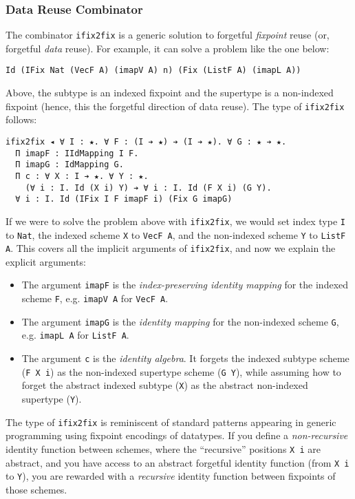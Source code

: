 \documentclass[acmsmall]{acmart}\settopmatter{}
\begin{document}
\subsubsection{Data Reuse Combinator}

The combinator \verb;ifix2fix; is a generic solution to forgetful
\textit{fixpoint} reuse (or, forgetful \textit{data} reuse). For
example, it can solve a problem like the one below:

\begin{verbatim}
Id (IFix Nat (VecF A) (imapV A) n) (Fix (ListF A) (imapL A))
\end{verbatim}
Above, the subtype is an indexed fixpoint and the supertype is a
non-indexed fixpoint (hence, this the forgetful direction of data
reuse). The type of \verb;ifix2fix; follows:

\begin{verbatim}
ifix2fix ◂ ∀ I : ★. ∀ F : (I ➔ ★) ➔ (I ➔ ★). ∀ G : ★ ➔ ★. 
  Π imapF : IIdMapping I F. 
  Π imapG : IdMapping G.
  Π c : ∀ X : I ➔ ★. ∀ Y : ★. 
    (∀ i : I. Id (X i) Y) ➔ ∀ i : I. Id (F X i) (G Y).
  ∀ i : I. Id (IFix I F imapF i) (Fix G imapG)
\end{verbatim}
If we were to solve the problem above with \verb;ifix2fix;,
we would set index type \verb;I; to \verb;Nat;,
the indexed scheme \verb;X; to
\verb;VecF A;, and the non-indexed scheme \verb;Y; to \verb;ListF A;.
This covers all the implicit arguments of \verb;ifix2fix;,
and now we explain the explicit arguments:

\begin{itemize}
\item The argument \verb;imapF;  is the
  \textit{index-preserving identity mapping} for the indexed scheme \verb;F;,
  e.g. \verb;imapV A; for \verb;VecF A;.

\item The argument \verb;imapG; is the
  \textit{identity mapping} for the non-indexed scheme \verb;G;,
  e.g. \verb;imapL A; for \verb;ListF A;.

\item The argument \verb;c; is the \textit{identity algebra}. It
  forgets the indexed subtype scheme (\verb;F X i;) as
  the non-indexed supertype scheme (\verb;G Y;), while assuming
  how to forget the abstract indexed subtype (\verb;X;) as the
  abstract non-indexed supertype (\verb;Y;).
\end{itemize}

The type of \verb;ifix2fix; is reminiscent of standard patterns
appearing in generic programming using fixpoint encodings of
datatypes. If you define a \textit{non-recursive}
identity function between schemes, where the
``recursive'' positions \verb;X i; are abstract, and you have access to an
abstract forgetful identity function (from \verb;X i; to \verb;Y;),
you are rewarded with a \textit{recursive}
identity function between fixpoints of those schemes.
\end{document}
